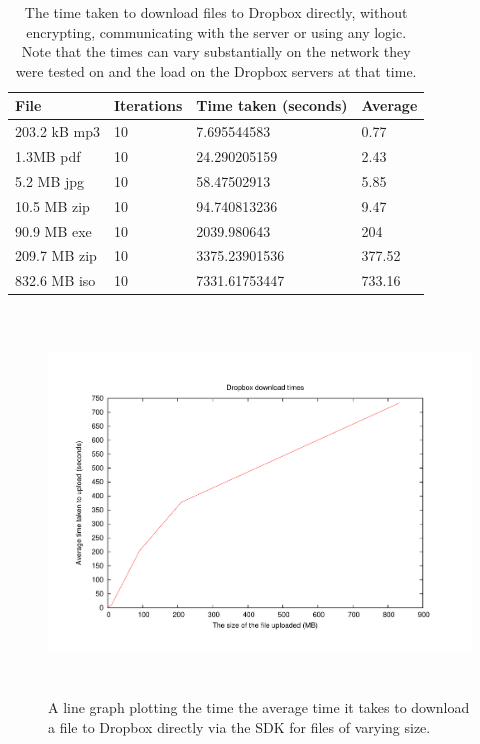 \documentclass[12pt, titlepage]{article}
\begin{document}
\bigskip
\begin{table}[h!]
\begin{center}
    \begin{tabular}{ | l | l | l | l |}
    \hline
    \textbf{File} & \textbf{Iterations} & \textbf{Time taken (seconds)} & \textbf{Average} \\ \hline
    
    203.2 kB mp3 & 10 & 7.695544583 & 0.77 \\ \hline
    1.3MB pdf & 10 & 24.290205159 & 2.43 \\ \hline
    5.2 MB jpg & 10 & 58.47502913 & 5.85 \\ \hline
    10.5 MB zip & 10 & 94.740813236 & 9.47 \\ \hline
    90.9 MB exe & 10 & 2039.980643 & 204 \\ \hline
    209.7 MB zip & 10 & 3375.23901536 & 377.52 \\ \hline
    832.6 MB iso & 10 & 7331.61753447 & 733.16 \\ \hline    
    \end{tabular}
    \caption{The time taken to download files to Dropbox directly, without encrypting, communicating with the server or using any logic. \\ Note that the times can vary substantially on the network they were tested on and the load on the Dropbox servers at that time.} \label{tab:uploadDropboxBenchmark}
    \end{center}
\end{table}

\begin{figure}[!t]
\centerline{\includegraphics[height=4.0in,width=7in,angle=0]{plots/dropboxDownload/dropboxDownloadTimes.pdf}}
\caption{A line graph plotting the time the average time it takes to download a file to Dropbox directly via the SDK for files of varying size.}
\label{fig:dropboxDownloadLineGraph}
\end{figure}
\end{document}
